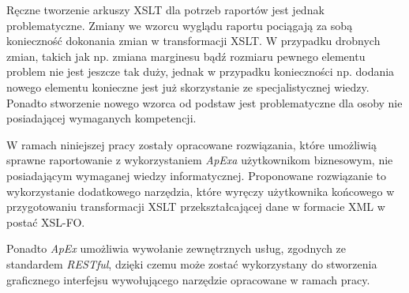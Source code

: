 \documentclass[11pt,a4paper]{article}
\begin{document}
Ręczne tworzenie arkuszy XSLT dla potrzeb raportów jest jednak problematyczne. Zmiany we wzorcu wyglądu raportu pociągają za sobą konieczność dokonania zmian w transformacji XSLT. W przypadku drobnych zmian, takich jak np. zmiana marginesu bądź rozmiaru pewnego elementu problem nie jest jeszcze tak duży, jednak w przypadku konieczności np. dodania nowego elementu konieczne jest już skorzystanie ze specjalistycznej wiedzy. Ponadto stworzenie nowego wzorca od podstaw jest problematyczne dla osoby nie posiadającej wymaganych kompetencji.

W ramach niniejszej pracy zostały opracowane rozwiązania, które umożliwią sprawne raportowanie z wykorzystaniem \emph{ApExa} użytkownikom biznesowym, nie posiadającym wymaganej wiedzy informatycznej. Proponowane rozwiązanie to wykorzystanie dodatkowego narzędzia, które wyręczy użytkownika końcowego w przygotowaniu transformacji XSLT przekształcającej dane w formacie XML w postać XSL-FO.

Ponadto \emph{ApEx} umożliwia wywołanie zewnętrznych usług, zgodnych ze standardem \emph{RESTful}, dzięki czemu może zostać wykorzystany do stworzenia graficznego interfejsu wywołującego narzędzie opracowane w ramach pracy.
\end{document}
